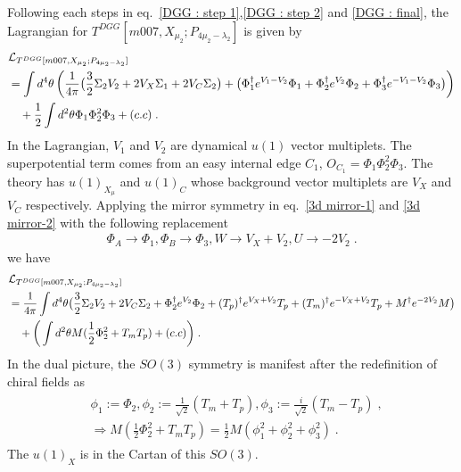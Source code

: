 \documentclass[a4paper,11pt]{article}
\begin{document}
%
Following each steps in eq.~\eqref{DGG : step 1},\eqref{DGG : step 2} and \eqref{DGG : final}, the Lagrangian for $T^{DGG}[m007,X_{\mu_2};P_{4\mu_2 -\lambda_2}]$ is given by 
%
\begin{align}
\begin{split}
&\mathcal{L}_{T^{DGG}[m007,X_{\mu_2};P_{4\mu_2 -\lambda_2}]}
\\
&=  \int d^4\theta \left( \frac{1}{4\pi } \big{(}\frac{3}2 \Sigma_2  V_2+  2V_{X}\Sigma_1  +2V_{C} \Sigma_2\big{)} + \big{(} \Phi_{1}^\dagger e^{V_1-V_2} \Phi_1+\Phi_{2}^\dagger e^{V_2} \Phi_2+\Phi_{3}^\dagger e^{-V_1-V_{2}} \Phi_3 \big{)} \right)
\\
& \quad + \frac{1}2 \int d^2 \theta  \Phi_1 \Phi_2^2 \Phi_3 +(c.c) \;.
\end{split}
\end{align}
%
In the Lagrangian, $V_1$ and  $V_2$ are dynamical $u(1)$ vector multiplets. The superpotential term comes from an easy internal edge $C_1$, $O_{C_1} = \Phi_1 \Phi_2^2 \Phi_3$. The theory has $u(1)_{X_\mu}$ and $u(1)_C$ whose background vector multiplets are $V_X$ and $V_C$ respectively. Applying the mirror symmetry in eq.~\eqref{3d mirror-1} and \eqref{3d mirror-2} with the following replacement
%
\begin{align}
\Phi_A \rightarrow \Phi_1, \Phi_B \rightarrow \Phi_3, W \rightarrow V_X+ V_2, U \rightarrow -2 V_2\;.
\end{align}
%
we have
%
\begin{align}
\begin{split}
&\mathcal{L}_{T^{DGG}[m007,X_{\mu_2};P_{4\mu_2 -\lambda_2}]}
\\
&=  \frac{1}{4\pi }\int d^4\theta \big{(}\frac{3}2 \Sigma_2  V_2 +2V_{C} \Sigma_2 +\Phi_{2}^\dagger e^{V_2} \Phi_2+ (T_p)^\dagger e^{V_X+ V_2} T_p +(T_m)^\dagger e^{-V_X+V_2} T_p +M^\dagger e^{-2V_2} M \big{)}
\\
& \quad + \bigg{(} \int d^2 \theta M ( \frac{1}2\Phi_2^2 + T_m T_p)  +(c.c) \bigg{)}\;.
\end{split}
\end{align}
%
In the dual picture, the $SO(3)$ symmetry is manifest after the redefinition of chiral fields as
\begin{align}
\begin{split}
&\phi_1 := \Phi_2, \phi_2 := \frac{1}{\sqrt{2}} (T_m +T_p),\phi_3 := \frac{i}{\sqrt{2}} (T_m -T_p)\;,
\\
&\Rightarrow M(\frac{1}2\Phi_2^2+ T_m T_p )=\frac{1}2 M( \phi_1^2 +\phi_2^2 +\phi_3^2 )\;.
\end{split}
\end{align}
%
The $u(1)_X$ is in the Cartan of this $SO(3)$.
\end{document}
